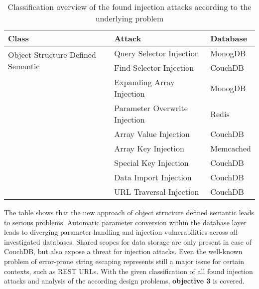 \begin{table}[h]
  \sffamily
  \centering 
  \begin{tabular}{lll}
  \textbf{Class} & \textbf{Attack} & \textbf{Database} \\ \hline
  \multirow{2}{*}{Object Structure Defined Semantic}
    & Query Selector Injection & MonogDB \\
    & Find Selector Injection & CouchDB \\ \hdashline
  \multirow{4}{*}{Diverging Parameter Handling}
    & Expanding Array Injection & MonogDB \\
    & Parameter Overwrite Injection & Redis \\
    & Array Value Injection & CouchDB \\
    & Array Key Injection & Memcached \\ \hdashline
  \multirow{2}{*}{Shared Scope for Data}
    & Special Key Injection & CouchDB \\
    & Data Import Injection & CouchDB \\ \hdashline
  \multirow{1}{*}{Error-prone String Escaping}
    & URL Traversal Injection & CouchDB \\ \hline
  \end{tabular}
  \caption{Classification overview of the found injection attacks according to the underlying problem}
  \label{tab:attack_classification_overview}
\end{table}

The table shows that the new approach of object structure defined semantic leads to serious problems. Automatic parameter conversion within the database layer leads to diverging parameter handling and injection vulnerabilities across all investigated databases. Shared scopes for data storage are only present in case of CouchDB, but also expose a threat for injection attacks. Even the well-known problem of error-prone string escaping represents still a major issue for certain contexts, such as REST URLs. With the given classification of all found injection attacks and analysis of the according design problems, \textbf{objective 3} is covered.